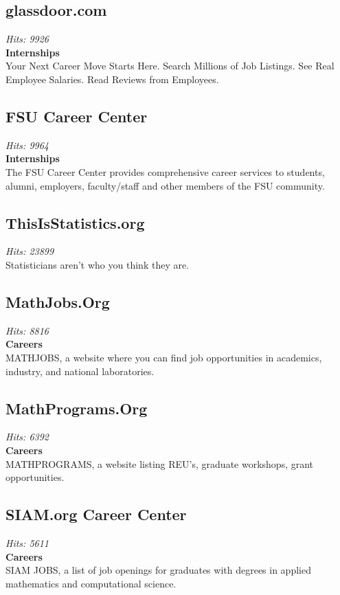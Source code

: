 \documentclass[12pt,a4paper]{article}
\begin{document}
\subsection{glassdoor.com}
\textit{Hits: 9926} \\
\textbf{Internships} \\
Your Next Career Move Starts Here. Search Millions of Job Listings. See Real Employee Salaries. Read Reviews from Employees.

\subsection{FSU Career Center}
\textit{Hits: 9964} \\
\textbf{Internships} \\
The FSU Career Center provides comprehensive career services to students, alumni, employers, faculty/staff and other members of the FSU community.

\subsection{ThisIsStatistics.org}
\textit{Hits: 23899} \\
Statisticians aren’t who you think they are.

\subsection{MathJobs.Org}
\textit{Hits: 8816} \\
\textbf{Careers} \\
MATHJOBS, a website where you can find job opportunities in academics, industry, and national laboratories.

\subsection{MathPrograms.Org}
\textit{Hits: 6392} \\
\textbf{Careers} \\
MATHPROGRAMS, a website listing REU's, graduate workshops, grant opportunities.

\subsection{SIAM.org Career Center}
\textit{Hits: 5611} \\
\textbf{Careers} \\
SIAM JOBS, a list of job openings for graduates with degrees in applied mathematics and computational science.
\end{document}
